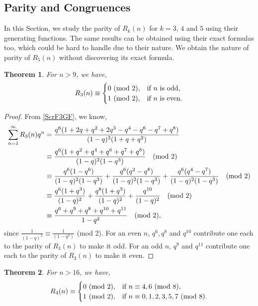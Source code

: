 \documentclass[12pt,reqno]{amsart}
\numberwithin{equation}{section}
\theoremstyle{plain}
\newtheorem{theorem}{Theorem}[section]
\begin{document}
	\subsection{Parity and Congruences}\label{SecPar}
	In this Section, we study the parity of $R_k(n)$ for $k=3$, $4$ and $5$ using their generating functions. The same results can be obtained using their exact formulas too, which could be hard to handle due to their nature. We obtain the nature of parity of $R_5(n)$ without discovering its exact formula.
	\begin{theorem}\label{R3CTh}
		For $n>9$, we have,
		\begin{align*}
			R_3(n) \equiv 
			\begin{cases}
				0 \ (\textup{mod } 2), & \textup{if $n$ is odd,}\\
				1 \ (\textup{mod } 2), & \textup{if $n$ is even.}
			\end{cases}
		\end{align*}
	\end{theorem}
	\begin{proof}
		From \eqref{ScrF3GF}, we know,
		\begin{align*}
			\sum_{n=1}^{\infty} R_3(n) q^n &= \frac{q^6(1+2q+q^2+2q^3-q^4-q^6-q^7+q^8)}{(1-q)^3(1+q+q^2)} \\
			&\equiv  \frac{q^6(1+q^2+q^4+q^6+q^7+q^8)}{(1-q)^2(1-q^3)} \quad \textup{(mod 2)} \\
			&\equiv  \frac{q^6(1-q^6)}{(1-q)^2(1-q^3)} + \frac{q^6(q^2-q^8)}{(1-q)^2(1-q^3)}+ \frac{q^6(q^4-q^7)}{(1-q)^2(1-q^3)}  \quad \textup{(mod 2)} \\
			&\equiv  \frac{q^6(1+q^3)}{(1-q)^2} + \frac{q^8(1+q^3)}{(1-q)^2}+ \frac{q^{10}}{(1-q)^2}  \quad \textup{(mod 2)} \\
			&\equiv \frac{q^6+q^9+q^8+q^{10}+q^{11}}{1-q^2} \quad \textup{(mod 2)},
		\end{align*}
		since $\frac{1}{(1-q)^2} \equiv \frac{1}{(1-q^2)}$ (mod 2). For an even $n$, $q^6, q^8$ and $q^{10}$  contribute one each to the parity of $R_3(n)$ to make it odd. For an odd $n$, $q^9$ and $q^{11}$ contribute one each to the parity of $R_3(n)$ to make it even.
	\end{proof}
	\begin{theorem}\label{R4CTh}
		For $n>16$, we have,
		\begin{align*}
			R_4(n)\equiv
			\begin{cases}
				0 \ (\textup{mod } 2), & \textup{if $n \equiv 4,6$ (mod 8)}, \\
				1 \ (\textup{mod } 2), & \textup{if $n \equiv 0,1,2,3,5,7$ (mod 8)}.
			\end{cases}
		\end{align*}
	\end{theorem}
\end{document}
